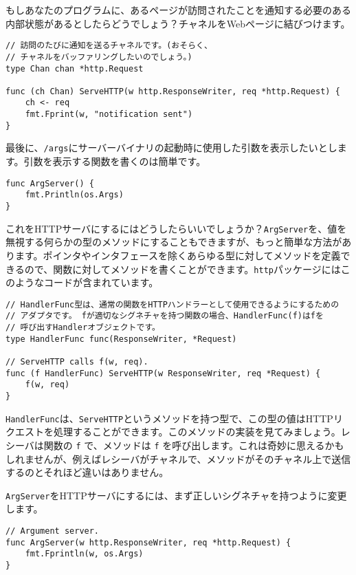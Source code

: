 \documentclass{jsarticle}
\begin{document}
もしあなたのプログラムに、あるページが訪問されたことを通知する必要のある内部状態があるとしたらどうでしょう？チャネルをWebページに結びつけます。

\begin{lstlisting}[numbers=none]
// 訪問のたびに通知を送るチャネルです。(おそらく、
// チャネルをバッファリングしたいのでしょう。)
type Chan chan *http.Request

func (ch Chan) ServeHTTP(w http.ResponseWriter, req *http.Request) {
    ch <- req
    fmt.Fprint(w, "notification sent")
}
\end{lstlisting}

最後に、\texttt{/args}にサーバーバイナリの起動時に使用した引数を表示したいとします。引数を表示する関数を書くのは簡単です。

\begin{lstlisting}[numbers=none]
func ArgServer() {
    fmt.Println(os.Args)
}
\end{lstlisting}

これをHTTPサーバにするにはどうしたらいいでしょうか？\texttt{ArgServer}を、値を無視する何らかの型のメソッドにすることもできますが、もっと簡単な方法があります。ポインタやインタフェースを除くあらゆる型に対してメソッドを定義できるので、関数に対してメソッドを書くことができます。\texttt{http}パッケージにはこのようなコードが含まれています。

\begin{lstlisting}[numbers=none]
// HandlerFunc型は、通常の関数をHTTPハンドラーとして使用できるようにするための
// アダプタです。 fが適切なシグネチャを持つ関数の場合、HandlerFunc(f)はfを
// 呼び出すHandlerオブジェクトです。
type HandlerFunc func(ResponseWriter, *Request)

// ServeHTTP calls f(w, req).
func (f HandlerFunc) ServeHTTP(w ResponseWriter, req *Request) {
    f(w, req)
}
\end{lstlisting}

\texttt{HandlerFunc}は、\texttt{ServeHTTP}というメソッドを持つ型で、この型の値はHTTPリクエストを処理することができます。このメソッドの実装を見てみましょう。レシーバは関数の
\texttt{f} で、メソッドは \texttt{f}
を呼び出します。これは奇妙に思えるかもしれませんが、例えばレシーバがチャネルで、メソッドがそのチャネル上で送信するのとそれほど違いはありません。

\texttt{ArgServer}をHTTPサーバにするには、まず正しいシグネチャを持つように変更します。

\begin{lstlisting}[numbers=none]
// Argument server.
func ArgServer(w http.ResponseWriter, req *http.Request) {
    fmt.Fprintln(w, os.Args)
}
\end{lstlisting}
\end{document}
